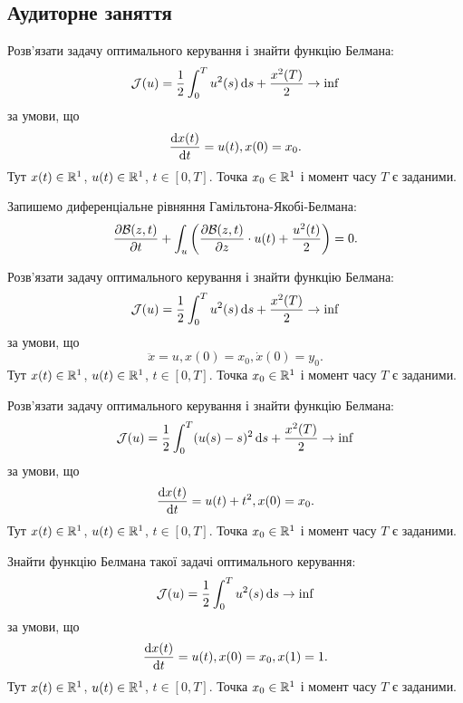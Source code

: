 \subsection{Аудиторне заняття}

\begin{problem}
	Розв'язати задачу оптимального керування і знайти функцію Белмана: \[ \mathcal{J} (u) = \frac12 \int_0^T u^2 (s) \mathop{}\!\mathrm{d} s + \frac{x^2 (T)}{2} \to \inf \] за умови, що \[ \frac{\mathop{}\!\mathrm{d} x (t)}{\mathop{}\!\mathrm{d} t} = u (t), x (0) = x_0. \] Тут $x (t) \in \mathbb{R}^1$, $u (t) \in \mathbb{R}^1$, $t \in [0, T]$. Точка $x_0 \in \mathbb{R}^1$ і момент часу $T$ є заданими.
\end{problem}

\begin{solution}
	Запишемо диференціальне рівняння Гамільтона-Якобі-Белмана: \[ \frac{\partial \mathcal{B} (z, t)}{\partial t} + \int_u \left( \frac{\partial \mathcal{B} (z, t)}{\partial z} \cdot u (t) + \frac{u^2 (t)}{2} \right) = 0. \]
\end{solution}

\begin{problem}
	Розв'язати задачу оптимального керування і знайти функцію Белмана: \[ \mathcal{J} (u) = \frac12 \int_0^T u^2 (s) \mathop{}\!\mathrm{d} s + \frac{x^2 (T)}{2} \to \inf \] за умови, що \[ \ddot x = u, x (0) = x_0, \dot x (0) = y_0. \] Тут $x (t) \in \mathbb{R}^1$, $u (t) \in \mathbb{R}^1$, $t \in [0, T]$. Точка $x_0 \in \mathbb{R}^1$ і момент часу $T$ є заданими.
\end{problem}

\begin{solution}
\end{solution}

\begin{problem}
	Розв'язати задачу оптимального керування і знайти функцію Белмана: \[ \mathcal{J} (u) = \frac12 \int_0^T (u (s) - s)^2 \mathop{}\!\mathrm{d} s + \frac{x^2 (T)}{2} \to \inf \] за умови, що \[ \frac{\mathop{}\!\mathrm{d} x (t)}{\mathop{}\!\mathrm{d} t} = u (t) + t^2, x (0) = x_0. \] Тут $x (t) \in \mathbb{R}^1$, $u (t) \in \mathbb{R}^1$, $t \in [0, T]$. Точка $x_0 \in \mathbb{R}^1$ і момент часу $T$ є заданими.
\end{problem}

\begin{solution}
\end{solution}

\begin{problem}
	Знайти функцію Белмана такої задачі оптимального керування: \[ \mathcal{J} (u) = \frac12 \int_0^T u^2 (s) \mathop{}\!\mathrm{d} s \to \inf \] за умови, що \[ \frac{\mathop{}\!\mathrm{d} x (t)}{\mathop{}\!\mathrm{d} t} = u (t), x (0) = x_0, x (1) = 1. \] Тут $x (t) \in \mathbb{R}^1$, $u (t) \in \mathbb{R}^1$, $t \in [0, T]$. Точка $x_0 \in \mathbb{R}^1$ і момент часу $T$ є заданими.
\end{problem}

\begin{solution}
\end{solution}
